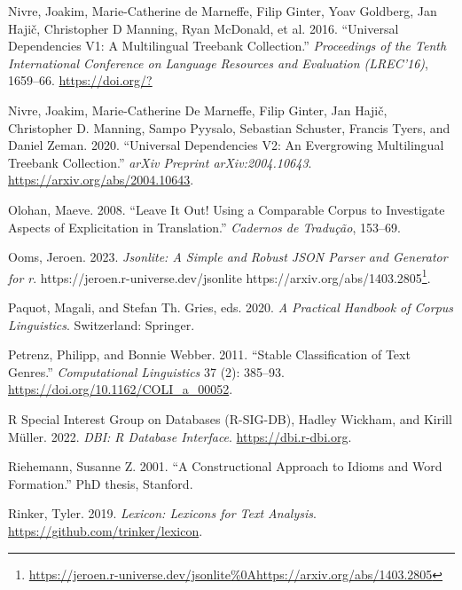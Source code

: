 \documentclass[
  letterpaper,
  DIV=11,
  numbers=noendperiod]{scrreport}
\newlength{\cslhangindent}
\newlength{\cslentryspacingunit} %
\newenvironment{CSLReferences}[2] %
 {%
  \setlength{\parindent}{0pt}
  \ifodd #1
  \let\oldpar\par
  \def\par{\hangindent=\cslhangindent\oldpar}
  \fi
  \setlength{\parskip}{#2\cslentryspacingunit}
 }%
 {}
\theoremstyle{definition}
\theoremstyle{remark}
\DeclareRobustCommand{\href}[2]{#2\footnote{\url{#1}}}
\begin{document}
\begin{CSLReferences}{1}{0}
\leavevmode{}%
Nivre, Joakim, Marie-Catherine de Marneffe, Filip Ginter, Yoav Goldberg,
Jan Hajič, Christopher D Manning, Ryan McDonald, et al. 2016.
{``Universal Dependencies V1: A Multilingual Treebank Collection.''}
\emph{Proceedings of the Tenth International Conference on Language
Resources and Evaluation (LREC'16)}, 1659--66. \url{https://doi.org/?}

\leavevmode{}%
Nivre, Joakim, Marie-Catherine De Marneffe, Filip Ginter, Jan Hajič,
Christopher D. Manning, Sampo Pyysalo, Sebastian Schuster, Francis
Tyers, and Daniel Zeman. 2020. {``Universal Dependencies V2: An
Evergrowing Multilingual Treebank Collection.''} \emph{arXiv Preprint
arXiv:2004.10643}. \url{https://arxiv.org/abs/2004.10643}.

\leavevmode{}%
Olohan, Maeve. 2008. {``Leave It Out! Using a Comparable Corpus to
Investigate Aspects of Explicitation in Translation.''} \emph{Cadernos
de Tradução}, 153--69.

\leavevmode{}%
Ooms, Jeroen. 2023. \emph{Jsonlite: A Simple and Robust JSON Parser and
Generator for r}.
\href{https://jeroen.r-universe.dev/jsonlite\%0Ahttps://arxiv.org/abs/1403.2805}{https://jeroen.r-universe.dev/jsonlite
https://arxiv.org/abs/1403.2805}.

\leavevmode{}%
Paquot, Magali, and Stefan Th. Gries, eds. 2020. \emph{A Practical
Handbook of Corpus Linguistics}. Switzerland: Springer.

\leavevmode{}%
Petrenz, Philipp, and Bonnie Webber. 2011. {``Stable Classification of
Text Genres.''} \emph{Computational Linguistics} 37 (2): 385--93.
\url{https://doi.org/10.1162/COLI_a_00052}.

\leavevmode{}%
R Special Interest Group on Databases (R-SIG-DB), Hadley Wickham, and
Kirill Müller. 2022. \emph{DBI: R Database Interface}.
\url{https://dbi.r-dbi.org}.

\leavevmode{}%
Riehemann, Susanne Z. 2001. {``A Constructional Approach to Idioms and
Word Formation.''} PhD thesis, Stanford.

\leavevmode{}%
Rinker, Tyler. 2019. \emph{Lexicon: Lexicons for Text Analysis}.
\url{https://github.com/trinker/lexicon}.


\end{CSLReferences}
\end{document}
